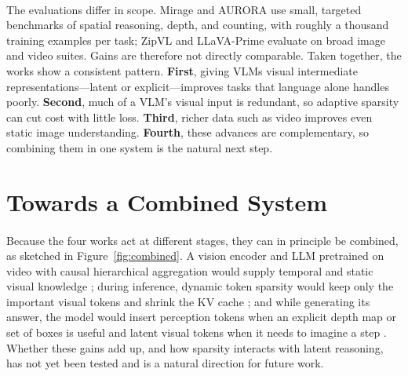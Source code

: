 \documentclass[12pt,a4paper,final]{extreport}
\begin{document}
\paragraph{} The evaluations differ in scope. Mirage and AURORA use small, targeted benchmarks of spatial reasoning, depth, and counting, with roughly a thousand training examples per task; ZipVL and LLaVA-Prime evaluate on broad image and video suites. Gains are therefore not directly comparable. Taken together, the works show a consistent pattern. \textbf{First}, giving VLMs visual intermediate representations---latent or explicit---improves tasks that language alone handles poorly. \textbf{Second}, much of a VLM's visual input is redundant, so adaptive sparsity can cut cost with little loss. \textbf{Third}, richer data such as video improves even static image understanding. \textbf{Fourth}, these advances are complementary, so combining them in one system is the natural next step.

\section{Towards a Combined System}

\paragraph{} Because the four works act at different stages, they can in principle be combined, as sketched in Figure~\ref{fig:combined}. A vision encoder and LLM pretrained on video with causal hierarchical aggregation would supply temporal and static visual knowledge \cite{p4}; during inference, dynamic token sparsity would keep only the important visual tokens and shrink the KV cache \cite{p3}; and while generating its answer, the model would insert perception tokens when an explicit depth map or set of boxes is useful \cite{p2} and latent visual tokens when it needs to imagine a step \cite{p1}. Whether these gains add up, and how sparsity interacts with latent reasoning, has not yet been tested and is a natural direction for future work.
\end{document}
